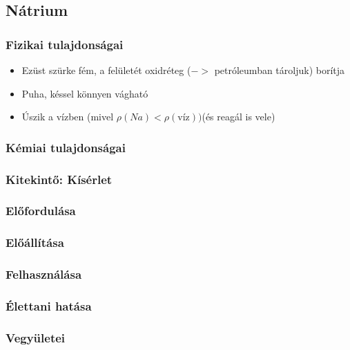 \documentclass{article}
\begin{document}
\subsection{Nátrium}
\subsubsection{Fizikai tulajdonságai}
\begin{itemize}
    \item Ezüst szürke fém, a felületét oxidréteg ($->$ petróleumban tároljuk) borítja
    \item Puha, késsel könnyen vágható
    \item Úszik a vízben (mivel $\rho(Na) < \rho(\text{víz})) $(és reagál is vele)
\end{itemize}

\subsubsection{Kémiai tulajdonságai}
\subsubsection{Kitekintő: Kísérlet}
\subsubsection{Előfordulása}
\subsubsection{Előállítása}
\subsubsection{Felhasználása}
\subsubsection{Élettani hatása}
\subsubsection{Vegyületei}

\end{document}
